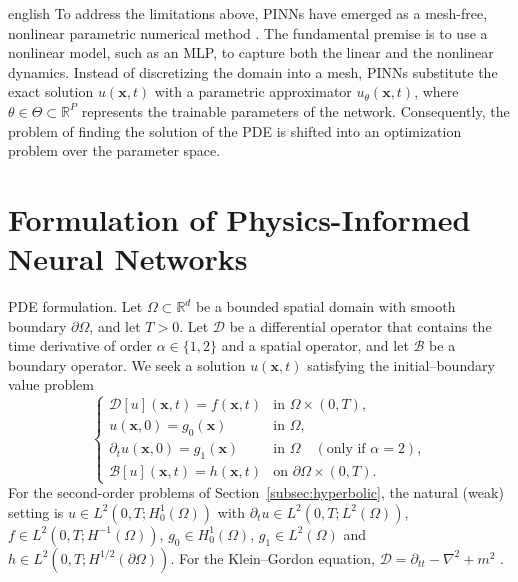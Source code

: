 \documentclass[0000.tex]{subfiles}
\begin{document}
\begin{hyphenrules}{english}
To address the limitations above, PINNs have emerged as a mesh-free, nonlinear parametric numerical
method \cite{raissi2019}. The fundamental premise is to use a nonlinear model, such as an MLP, to
capture both the linear and the nonlinear dynamics. Instead of discretizing the domain into a mesh,
PINNs substitute the exact solution $u(\mathbf{x},t)$ with a parametric approximator $u_\theta(\mathbf{x},t)$, where
$\theta\in\Theta\subset\mathbb{R}^{P}$ represents the trainable parameters of the network. Consequently, the
problem of finding the solution of the PDE is shifted into an optimization problem over the parameter
space.

\section{Formulation of Physics-Informed Neural Networks}\label{sec:pinn-formulation}

\begin{definicion}{PDE formulation.}\label{def:pde-formulation}
Let $\Omega\subset\mathbb{R}^d$ be a bounded spatial domain with smooth boundary $\partial\Omega$, and let
$T>0$. Let $\mathcal{D}$ be a differential operator that contains the time derivative of order
$\alpha\in\{1,2\}$ and a spatial operator, and let $\mathcal{B}$ be a boundary operator. We seek a
solution $u(\mathbf{x},t)$ satisfying the initial--boundary value problem
\[
  \begin{cases}
    \mathcal{D}[u](\mathbf{x},t)=f(\mathbf{x},t) & \text{in } \Omega\times(0,T),\\
    u(\mathbf{x},0)=g_0(\mathbf{x}) & \text{in } \Omega,\\
    \partial_t u(\mathbf{x},0)=g_1(\mathbf{x}) & \text{in } \Omega\quad(\text{only if }\alpha=2),\\
    \mathcal{B}[u](\mathbf{x},t)=h(\mathbf{x},t) & \text{on } \partial\Omega\times(0,T).
  \end{cases}
\]
For the second-order problems of Section~\ref{subsec:hyperbolic}, the natural (weak) setting is
$u\in L^2(0,T;H^1_0(\Omega))$ with $\partial_t u\in L^2(0,T;L^2(\Omega))$, $f\in L^2(0,T;H^{-1}(\Omega))$,
$g_0\in H^1_0(\Omega)$, $g_1\in L^2(\Omega)$ and $h\in L^2(0,T;H^{1/2}(\partial\Omega))$. For the
Klein--Gordon equation, $\mathcal{D}=\partial_{tt}-\nabla^2+m^2$ \cite{qian2023}.
\end{definicion}


\end{hyphenrules}
\end{document}
